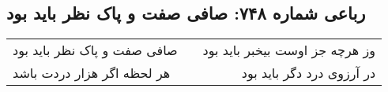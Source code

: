 \begin{center}
\section*{رباعی شماره ۷۴۸: صافی صفت و پاک نظر باید بود}
\label{sec:0748}
\begin{longtable}{l p{0.5cm} r}
صافی صفت و پاک نظر باید بود
&&
وز هرچه جز اوست بیخبر باید بود
\\
هر لحظه اگر هزار دردت باشد
&&
در آرزوی درد دگر باید بود
\\
\end{longtable}
\end{center}
